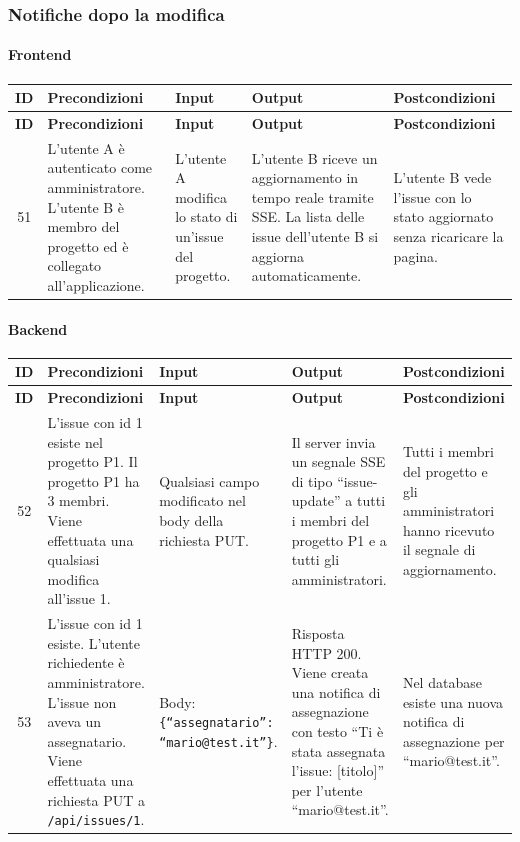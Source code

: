 \subsubsection{Notifiche dopo la modifica}

\paragraph{Frontend}

{
\small
\begin{longtable}{|c|p{3.8cm}|p{3.8cm}|p{3.8cm}|p{3.8cm}|}
\hline
\textbf{ID} & \textbf{Precondizioni} & \textbf{Input} & \textbf{Output} & \textbf{Postcondizioni} \\
\hline
\endfirsthead
\hline
\textbf{ID} & \textbf{Precondizioni} & \textbf{Input} & \textbf{Output} & \textbf{Postcondizioni} \\
\hline
\endhead
51 &
L'utente A \`e autenticato come amministratore. L'utente B \`e membro del progetto ed \`e collegato all'applicazione. &
L'utente A modifica lo stato di un'issue del progetto. &
L'utente B riceve un aggiornamento in tempo reale tramite SSE. La lista delle issue dell'utente B si aggiorna automaticamente. &
L'utente B vede l'issue con lo stato aggiornato senza ricaricare la pagina. \\
\hline
\end{longtable}
}

\paragraph{Backend}

{
\small
\begin{longtable}{|c|p{3.8cm}|p{3.8cm}|p{3.8cm}|p{3.8cm}|}
\hline
\textbf{ID} & \textbf{Precondizioni} & \textbf{Input} & \textbf{Output} & \textbf{Postcondizioni} \\
\hline
\endfirsthead
\hline
\textbf{ID} & \textbf{Precondizioni} & \textbf{Input} & \textbf{Output} & \textbf{Postcondizioni} \\
\hline
\endhead
52 &
L'issue con id 1 esiste nel progetto P1. Il progetto P1 ha 3 membri. Viene effettuata una qualsiasi modifica all'issue 1. &
Qualsiasi campo modificato nel body della richiesta PUT. &
Il server invia un segnale SSE di tipo ``issue-update'' a tutti i membri del progetto P1 e a tutti gli amministratori. &
Tutti i membri del progetto e gli amministratori hanno ricevuto il segnale di aggiornamento. \\
\hline
53 &
L'issue con id 1 esiste. L'utente richiedente \`e amministratore. L'issue non aveva un assegnatario. Viene effettuata una richiesta PUT a \texttt{/api/issues/1}. &
Body: \texttt{\{``assegnatario'': ``mario@test.it''\}}. &
Risposta HTTP 200. Viene creata una notifica di assegnazione con testo ``Ti \`e stata assegnata l'issue: [titolo]'' per l'utente ``mario@test.it''. &
Nel database esiste una nuova notifica di assegnazione per ``mario@test.it''. \\
\hline
\end{longtable}
}

